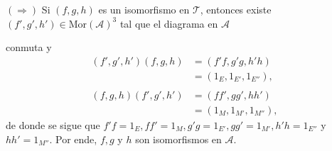\documentclass[tesis]{subfiles}
\begin{document}
\begin{Obs}
            $(\Rightarrow)$ Si $(f,g,h)$ es un isomorfismo en $\mathscr{T}$, entonces existe $(f',g',h')\in\text{Mor}(\mathscr{A})^3$ tal que el diagrama en $\mathscr{A}$
            \begin{center}
            \end{center}
            conmuta y
            \begin{align*}
                (f',g',h')(f,g,h) &= (f'f,g'g,h'h) \\
                                  &= (1_E, 1_{E'}, 1_{E''}), \\ \\
                (f,g,h)(f',g',h') &= (ff',gg',hh') \\
                                  &= (1_M, 1_{M'}, 1_{M''}),
            \end{align*}
            de donde se sigue que $f'f=1_E, ff'=1_M, g'g=1_{E'}, gg'=1_{M'}, h'h=1_{E''}$ y $hh'=1_{M''}$. Por ende, $f, g$ y $h$ son isomorfismos en $\mathscr{A}$. \\


\end{Obs}
\end{document}
